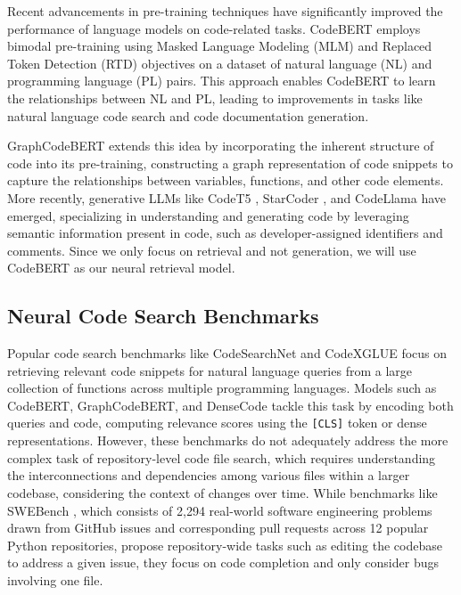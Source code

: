 Recent advancements in pre-training techniques have significantly improved the performance of language models on code-related tasks. CodeBERT \cite{codebert} employs bimodal pre-training using Masked Language Modeling (MLM) and Replaced Token Detection (RTD) objectives on a dataset of natural language (NL) and programming language (PL) pairs. This approach enables CodeBERT to learn the relationships between NL and PL, leading to improvements in tasks like natural language code search and code documentation generation.

GraphCodeBERT \cite{graphcodebert} extends this idea by incorporating the inherent structure of code into its pre-training, constructing a graph representation of code snippets to capture the relationships between variables, functions, and other code elements. More recently, generative LLMs like CodeT5 \cite{codet5}, StarCoder \cite{starcoder}, and CodeLlama have emerged, specializing in understanding and generating code by leveraging semantic information present in code, such as developer-assigned identifiers and comments. Since we only focus on retrieval and not generation, we will use CodeBERT as our neural retrieval model.

\subsection{Neural Code Search Benchmarks}
Popular code search benchmarks like CodeSearchNet \cite{codesearchnet} and CodeXGLUE \cite{codexglue} focus on retrieving relevant code snippets for natural language queries from a large collection of functions across multiple programming languages. Models such as CodeBERT, GraphCodeBERT, and DenseCode \cite{densecode} tackle this task by encoding both queries and code, computing relevance scores using the \texttt{[CLS]} token or dense representations. However, these benchmarks do not adequately address the more complex task of repository-level code file search, which requires understanding the interconnections and dependencies among various files within a larger codebase, considering the context of changes over time. While benchmarks like SWEBench \cite{swebench}, which consists of 2,294 real-world software engineering problems drawn from GitHub issues and corresponding pull requests across 12 popular Python repositories, propose repository-wide tasks such as editing the codebase to address a given issue, they focus on code completion and only consider bugs involving one file.

